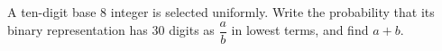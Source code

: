 A ten-digit base 8 integer is selected uniformly. Write the probability that its binary representation has 30 digits as $\dfrac{a}{b}$ in lowest terms, and find $a+b$.
